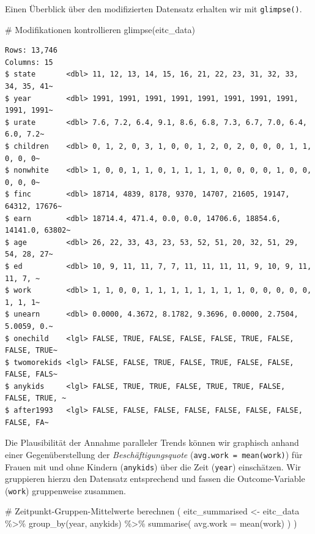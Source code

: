 \documentclass[
  a4paper,
  DIV=11,
  oneside]{scrreprt}
\newenvironment{Shaded}{\begin{snugshade}}{\end{snugshade}}
\newcommand{\AttributeTok}[1]{\textcolor[rgb]{0.40,0.45,0.13}{#1}}
\newcommand{\CommentTok}[1]{\textcolor[rgb]{0.37,0.37,0.37}{#1}}
\newcommand{\FunctionTok}[1]{\textcolor[rgb]{0.28,0.35,0.67}{#1}}
\newcommand{\NormalTok}[1]{\textcolor[rgb]{0.00,0.23,0.31}{#1}}
\newcommand{\OtherTok}[1]{\textcolor[rgb]{0.00,0.23,0.31}{#1}}
\newcommand{\SpecialCharTok}[1]{\textcolor[rgb]{0.37,0.37,0.37}{#1}}
\begin{document}
Einen Überblick über den modifizierten Datensatz erhalten wir mit
\texttt{glimpse()}.

\begin{Shaded}
\begin{Highlighting}[]
\CommentTok{\# Modifikationen kontrollieren}
\FunctionTok{glimpse}\NormalTok{(eitc\_data)}
\end{Highlighting}
\end{Shaded}

\begin{verbatim}
Rows: 13,746
Columns: 15
$ state       <dbl> 11, 12, 13, 14, 15, 16, 21, 22, 23, 31, 32, 33, 34, 35, 41~
$ year        <dbl> 1991, 1991, 1991, 1991, 1991, 1991, 1991, 1991, 1991, 1991~
$ urate       <dbl> 7.6, 7.2, 6.4, 9.1, 8.6, 6.8, 7.3, 6.7, 7.0, 6.4, 6.0, 7.2~
$ children    <dbl> 0, 1, 2, 0, 3, 1, 0, 0, 1, 2, 0, 2, 0, 0, 0, 1, 1, 0, 0, 0~
$ nonwhite    <dbl> 1, 0, 0, 1, 1, 0, 1, 1, 1, 1, 0, 0, 0, 0, 1, 0, 0, 0, 0, 0~
$ finc        <dbl> 18714, 4839, 8178, 9370, 14707, 21605, 19147, 64312, 17676~
$ earn        <dbl> 18714.4, 471.4, 0.0, 0.0, 14706.6, 18854.6, 14141.0, 63802~
$ age         <dbl> 26, 22, 33, 43, 23, 53, 52, 51, 20, 32, 51, 29, 54, 28, 27~
$ ed          <dbl> 10, 9, 11, 11, 7, 7, 11, 11, 11, 11, 9, 10, 9, 11, 11, 7, ~
$ work        <dbl> 1, 1, 0, 0, 1, 1, 1, 1, 1, 1, 1, 1, 0, 0, 0, 0, 0, 1, 1, 1~
$ unearn      <dbl> 0.0000, 4.3672, 8.1782, 9.3696, 0.0000, 2.7504, 5.0059, 0.~
$ onechild    <lgl> FALSE, TRUE, FALSE, FALSE, FALSE, TRUE, FALSE, FALSE, TRUE~
$ twomorekids <lgl> FALSE, FALSE, TRUE, FALSE, TRUE, FALSE, FALSE, FALSE, FALS~
$ anykids     <lgl> FALSE, TRUE, TRUE, FALSE, TRUE, TRUE, FALSE, FALSE, TRUE, ~
$ after1993   <lgl> FALSE, FALSE, FALSE, FALSE, FALSE, FALSE, FALSE, FALSE, FA~
\end{verbatim}

Die Plausibilität der Annahme paralleler Trends können wir graphisch
anhand einer Gegenüberstellung der \emph{Beschäftigungsquote}
(\texttt{avg.work\ =\ mean(work)}) für Frauen mit und ohne Kindern
(\texttt{anykids}) über die Zeit (\texttt{year}) einschätzen. Wir
gruppieren hierzu den Datensatz entsprechend und fassen die
Outcome-Variable (\texttt{work}) gruppenweise zusammen.

\begin{Shaded}
\begin{Highlighting}[]
\CommentTok{\# Zeitpunkt{-}Gruppen{-}Mittelwerte berechnen}
\NormalTok{(}
\NormalTok{  eitc\_summarised }\OtherTok{\textless{}{-}}\NormalTok{ eitc\_data }\SpecialCharTok{\%\textgreater{}\%}
  \FunctionTok{group\_by}\NormalTok{(year, anykids) }\SpecialCharTok{\%\textgreater{}\%}
  \FunctionTok{summarise}\NormalTok{(}
    \AttributeTok{avg.work =} \FunctionTok{mean}\NormalTok{(work)}
\NormalTok{  )}
\NormalTok{)}
\end{Highlighting}
\end{Shaded}
\end{document}
